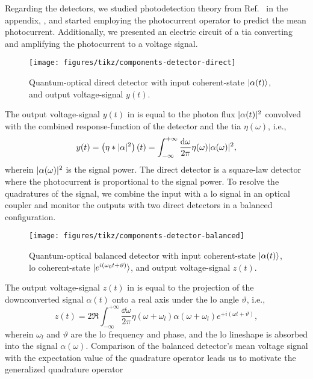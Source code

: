 Regarding the detectors, we studied photodetection theory from Ref.~\cite{Mandel1995,Kimble1984,Vogel2006} in the appendix, , and started employing the photocurrent operator to predict the mean photocurrent.
Additionally, we presented an electric circuit of a \gls{tia} converting and amplifying the photocurrent to a voltage signal.
\begin{figure}[htb]
    \centering
    \texttt{[image: figures/tikz/components-detector-direct]}
    \caption{Quantum-optical direct detector with input coherent-state $\lvert\alpha(t)\rangle$, and output voltage-signal $y(t)$.}\label{fig:components_detector_direct}
\end{figure}
The output voltage-signal $y(t)$ in  is equal to the photon flux $\lvert\alpha(t)\rvert^2$ convolved with the combined response-function of the detector and the \gls{tia} $\eta(\omega)$, i.e.,
\begin{equation}
	y(t)
	=
	\left(\eta\conv\abs{\alpha}^2\right)(t)
	=
	\int_{-\infty}^{+\infty}\frac{\dd{\omega}}{2\pi}
	\eta(\omega)
	\abs{\alpha(\omega)}^2
	,
\end{equation}
wherein $\lvert\alpha(\omega)\rvert^2$ is the signal power.
The direct detector is a square-law detector where the photocurrent is proportional to the signal power.
To resolve the quadratures of the signal, we combine the input with a \gls{lo} signal in an optical coupler and monitor the outputs with two direct detectors in a balanced configuration.
\begin{figure}[htb]
    \centering
    \texttt{[image: figures/tikz/components-detector-balanced]}
    \caption{Quantum-optical balanced detector with input coherent-state $\lvert\alpha(t)\rangle$, \gls{lo} coherent-state $\lvert e^{i(\omega_0t+\vartheta)}\rangle$, and output voltage-signal $z(t)$.}\label{fig:components_detector_balanced}
\end{figure}
The output voltage-signal $z(t)$ in  is equal to the projection of the downconverted signal $\alpha(t)$ onto a real axis under the \gls{lo} angle $\vartheta$, i.e.,
\begin{equation}
	z(t)
	=
	2\Re
	\int_{-\infty}^{+\infty}\frac{\dd{\omega}}{2\pi}
	\eta(\omega+\omega_l)
	\alpha(\omega+\omega_l)
	e^{+i(\omega t+\vartheta)}
	,
\end{equation}
wherein $\omega_l$ and $\vartheta$ are the \gls{lo} frequency and phase, and the \gls{lo} lineshape is absorbed into the signal $\alpha(\omega)$.
Comparison of the balanced detector's mean voltage signal with the expectation value of the quadrature operator leads us to motivate the generalized quadrature operator
